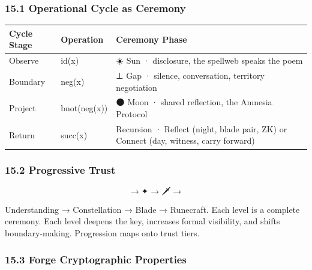 \documentclass[
]{article}
\newcounter{none} %
\begin{document}
\subsubsection{15.1 Operational Cycle as
Ceremony}\label{operational-cycle-as-ceremony}

{\def\LTcaptype{none} %
\begin{longtable}[]{@{}
  >{\raggedright\arraybackslash}p{}
  >{\raggedright\arraybackslash}p{}
  >{\raggedright\arraybackslash}p{}@{}}
\toprule\noalign{}
\begin{minipage}[b]{\linewidth}\raggedright
Cycle Stage
\end{minipage} & \begin{minipage}[b]{\linewidth}\raggedright
Operation
\end{minipage} & \begin{minipage}[b]{\linewidth}\raggedright
Ceremony Phase
\end{minipage} \\
\midrule\noalign{}
\endhead
\bottomrule\noalign{}
\endlastfoot
Observe & id(x) & ☀️ Sun · disclosure, the spellweb speaks the poem \\
Boundary & neg(x) & ⊥ Gap · silence, conversation, territory
negotiation \\
Project & bnot(neg(x)) & 🌑 Moon · shared reflection, the Amnesia
Protocol \\
Return & succ(x) & Recursion · Reflect (night, blade pair, ZK) or
Connect (day, witness, carry forward) \\
\end{longtable}
}

\subsubsection{15.2 Progressive Trust}\label{progressive-trust}

\[\text{🔑} \to \text{✦} \to \text{🗡️} \to \text{🔮}\]

Understanding → Constellation → Blade → Runecraft. Each level is a
complete ceremony. Each level deepens the key, increases formal
visibility, and shifts boundary-making. Progression maps onto trust
tiers.

\subsubsection{15.3 Forge Cryptographic
Properties}\label{forge-cryptographic-properties}
\end{document}
